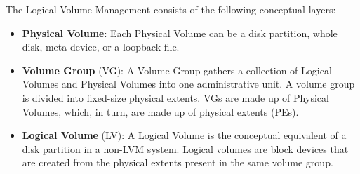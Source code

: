 The Logical Volume Management consists of the following conceptual layers:
\begin{itemize}
      \item
            \textbf{Physical Volume}: Each Physical Volume can be a disk
            partition, whole disk, meta-device, or a loopback file.
      \item
            \textbf{Volume Group} (VG): A Volume Group gathers a collection of
            Logical Volumes and Physical Volumes into one administrative unit. A
            volume group is divided into fixed-size physical extents. VGs are
            made up of Physical Volumes, which, in turn, are made up of
            physical extents (PEs).

      \item
            \textbf{Logical Volume} (LV): A Logical Volume is the conceptual
            equivalent of a disk partition in a non-LVM system. Logical volumes
            are block devices that are created from the physical extents present
            in the same volume group.
\end{itemize}
